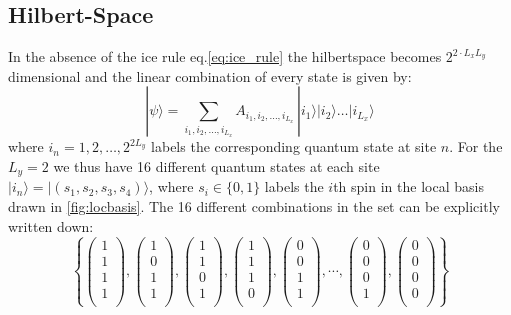 \documentclass[12pt, a4paper, twoside, titlepage]{article}
\begin{document}
\subsection{Hilbert-Space}
In the absence of the ice rule eq.\eqref{eq:ice_rule} the hilbertspace becomes $2^{2\cdot L_xL_y}$ dimensional  and the linear combination of every state is given by:
\begin{equation}\label{eq:hilbertspace}
|\psi\rangle = \sum_{i_1,i_2,\dots,i_{L_x}}A_{i_1,i_2,\dots,i_{L_x}} \,|i_1\rangle|i_2\rangle\dots|i_{L_x}\rangle
\end{equation}
where $i_n=1,2,\dots,2^{2L_y}$ labels the corresponding quantum state at site $n$. For the $L_y=2$
we thus have 16 different quantum states at each site $|i_n\rangle=|(s_1,s_2,s_3,s_4)\rangle$,
where $s_i\in\{0,1\}$ labels the $i$th spin in the local basis drawn in \cref{fig:locbasis}.
The 16 different combinations in the set can be explicitly written down:
\begin{equation}
  \left \{
  \begin{pmatrix}
  1  \\
  1 \\
  1 \\
  1 \\
  \end{pmatrix},
  \begin{pmatrix}
  1  \\
  0 \\
  1 \\
  1 \\
  \end{pmatrix},
  \begin{pmatrix}
  1  \\
  1 \\
  0 \\
  1 \\
  \end{pmatrix},
%
  \begin{pmatrix}
  1  \\
  1 \\
  1 \\
  0 \\
  \end{pmatrix},
%
  \begin{pmatrix}
  0  \\
  0 \\
  1 \\
  1 \\
  \end{pmatrix},
  \cdots,
  \begin{pmatrix}
  0  \\
  0 \\
  0 \\
  1 \\
  \end{pmatrix},
  \begin{pmatrix}
  0  \\
  0 \\
  0 \\
  0 \\
  \end{pmatrix}
  \right\}
\end{equation}
\end{document}
